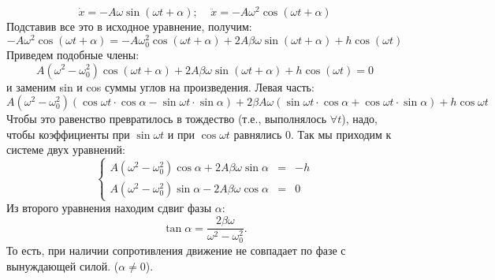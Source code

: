 \documentclass[12pt,epsfig,color,russian]{article}
\begin{document}
\begin{displaymath}
\dot{x}=-A\omega\sin(\omega t +\alpha);\;\;\;\;\ddot{x}=-A\omega^2\cos(\omega t +\alpha)
\end{displaymath}
Подставив все это в исходное уравнение, получим:
\begin{displaymath}
-A\omega^2\cos(\omega t +\alpha)=-A\omega_0^2\cos(\omega t +\alpha)+2A\beta \omega\sin(\omega t +\alpha)+h\cos(\omega t)
\end{displaymath}
Приведем подобные члены:
\begin{displaymath}
A(\omega^2-\omega_0^2)\cos(\omega t +\alpha)+2A\beta\omega\sin(\omega t +\alpha)+h\cos(\omega t)=0
\end{displaymath}
 и заменим sin и cos суммы углов на произведения. Левая часть:
\begin{displaymath}
A(\omega^2\!\!-\omega_0^2)(\cos\omega t\cdot\cos\alpha-\sin\omega t\cdot\sin\alpha)+
2\beta A\omega(\sin\omega t\cdot\cos\alpha+\cos\omega t\cdot\sin\alpha)+h\cos\omega t
\end{displaymath}
Чтобы это равенство превратилось в тождество (т.е., выполнялось $\forall t$), надо, чтобы коэффициенты при $\sin \omega t$ и при $\cos\omega t$ равнялись 0. Так мы приходим
к системе двух уравнений:
\begin{displaymath}
\left\{
\begin{array}{ccl}
A(\omega^2\!\!-\omega_0^2)\cos\alpha+2A\beta\omega\sin\alpha&=&-h\\
A(\omega^2\!\!-\omega_0^2)\sin\alpha-2A\beta\omega\cos\alpha&=&0
\end{array}
\right.
\end{displaymath}
Из второго уравнения находим сдвиг фазы $\alpha$:
\begin{displaymath}
\tan\alpha=\frac{2\beta\omega}{\omega^2\!\!-\omega_0^2}.
\end{displaymath}
То есть, при наличии сопротивления движение не совпадает по фазе с вынуждающей силой.
 ($\alpha\neq0$).
\end{document}
